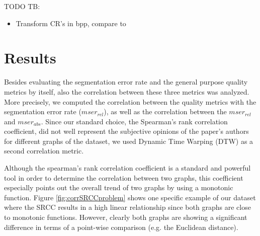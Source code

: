 \documentclass[10pt,twocolumn,letterpaper]{article}
\begin{document}
TODO TB:
\begin{itemize}
 \item Transform CR's in bpp, compare to \cite{severeCompression}
\end{itemize}



\section{Results}
\label{section:results}
Besides evaluating the segmentation error rate and the general purpose quality metrics by itself, also the correlation between these three metrics was analyzed. More precisely, we computed the correlation between the quality metrics with the segmentation error rate ($mser_{rel}$), as well as the correlation between the $mser_{rel}$ and $mser_{abs}$.
Since our standard choice, the Spearman’s rank correlation coefficient, did not well represent the subjective opinions of the paper’s authors for different graphs of the dataset, we used Dynamic Time Warping (DTW) as a second correlation metric.


Although the spearman’s rank correlation coefficient is a standard and powerful tool in order to determine the correlation between two graphs, this coefficient especially points out the overall trend of two graphs by using a monotonic function. Figure \ref{fig:corrSRCCproblem} shows one specific example of our dataset where the SRCC results in a high linear relationship since both graphs are close to monotonic functions. However, clearly both graphs are showing a significant difference in terms of a point-wise comparison (e.g. the Euclidean distance).
\end{document}
